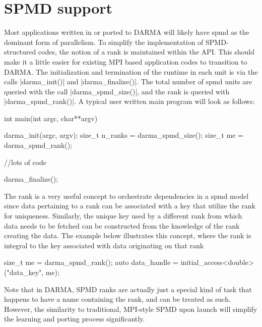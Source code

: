
\section{SPMD support}
\label{sec:spmd}
\lstMakeShortInline[style=CppCodeInlineStyle]{\|}
Most applications written in or ported to DARMA will likely have \gls{spmd} as
the dominant form of parallelism.
To simplify the implementation of SPMD-structured codes, the notion of 
a \gls{rank} is maintained within the \gls{API}.   
This should make it a little easier for existing MPI based application codes to transition 
to DARMA. The initialization and termination of the runtime in each unit 
is via the calls |darma_init()| and |darma_finalize()|. 
The total number of \gls{spmd} units are queried with the call |darma_spmd_size()|,
and the rank is queried with |darma_spmd_rank()|. A typical user 
written main program will look as follows:
\begin{CppCode}
int main(int argc, char**argv){

	darma_init(argc, argv);
	size_t n_ranks = darma_spmd_size();
	size_t me = darma_spmd_rank();

	//lots of code

	darma_finalize();
}
\end{CppCode}

The rank is a very useful concept to orchestrate dependencies in a \gls{spmd}
model since data pertaining to a rank can be associated with a key that utilize
the rank for uniqueness. Similarly, the unique key used by a different rank
from which data needs to be fetched can be constructed from the knowledge of
the rank creating the data.  The example below illustrates this concept, where
the rank is integral to the key associated with data originating on that rank
\begin{CppCode}
size_t me = darma_spmd_rank();
auto data_handle = initial_access<double>("data_key", me);
\end{CppCode}  
Note that in DARMA, SPMD ranks are actually just a special kind of task that
happens to have a name containing the rank, and can be treated as such. 
However, the similarity to traditional, MPI-style SPMD upon launch will simplify
the learning and porting process significantly.


\lstDeleteShortInline{\|}